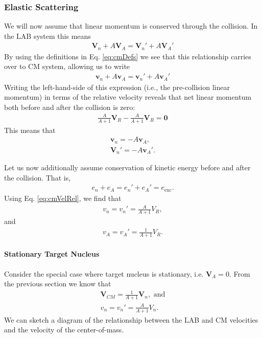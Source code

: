 \documentclass[11pt]{article}
\renewcommand\vec{\mathbf}
\begin{document}
\subsubsection{Elastic Scattering}
\label{sec:orgheadline4}
We will now assume that linear momentum is conserved through the collision.  In the LAB system this means
\begin{align}
  \vec{V}_n + A\vec{V}_A = \vec{V}_n' + A\vec{V}_A'
\end{align}
By using the definitions in Eq. \eqref{eq:cmDefs} we see that this relationship carries over to CM system, allowing us to write
\begin{align}
  \vec{v}_n + A\vec{v}_A = \vec{v}_n' + A\vec{v}_A'
\end{align}
Writing the left-hand-side of this expression (i.e., the pre-collision linear momentum) in terms of the relative velocity reveals that net linear momentum both before and after the collision is zero:
\begin{align}
  \frac{A}{A+1}\vec{V}_R - \frac{A}{A+1}\vec{V}_R = \vec{0}
\end{align}
This means that
\begin{align}
  \vec{v}_n = -A \vec{v}_A, \\
  \vec{V}_n' = -A \vec{v}_A'.
\end{align}

Let us now additionally assume conservation of kinetic energy before and after the collision.  That is, 
\begin{align}
  e_n + e_A = e_n' + e_A' = e_{\text{exc}}.
\end{align}
Using Eq. \eqref{eq:cmVelRel}, we find that 
\begin{align}
  v_n = v_n' = \frac{A}{A+1}V_R,
\end{align}
and
\begin{align}
  v_A = v_A' = \frac{1}{A+1}V_R.
\end{align}

\paragraph{Stationary Target Nucleus}
\label{sec:orgheadline3}
Consider the special case where target nucleus is stationary, i.e. \(\vec{V}_A = 0\).  From the previous section we know that
\begin{align}
  \vec{V}_{CM} = \frac{1}{A+1} \vec{V}_n, \text{ and} \\
  v_n = v_n' = \frac{A}{A+1}V_n.
\end{align}
We can sketch a diagram of the relationship between the LAB and CM velocities and the velocity of the center-of-mass.
\end{document}
